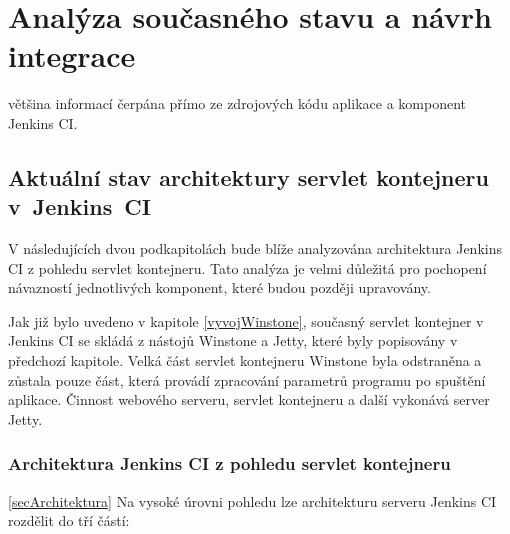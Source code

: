 
\chapter{Analýza současného stavu a návrh integrace}
    většina informací čerpána přímo ze zdrojových kódu aplikace a komponent Jenkins CI.
    
    \section{Aktuální stav architektury servlet kontejneru v~Jenkins~CI}
        V následujících dvou podkapitolách bude blíže analyzována architektura
        Jenkins CI z pohledu servlet kontejneru. Tato analýza je velmi důležitá
        pro pochopení návazností jednotlivých komponent, které budou později upravovány.

        Jak již bylo uvedeno v kapitole \ref{vyvojWinstone}, současný servlet kontejner 
        v Jenkins CI se skládá z nástojů Winstone a Jetty, které byly popisovány v 
        předchozí kapitole. Velká část servlet
        kontejneru Winstone byla odstraněna a zůstala pouze část, která
        provádí zpracování parametrů
        programu po spuštění aplikace. Činnost webového serveru, servlet kontejneru
        a další vykonává server Jetty.
        

        \subsection{Architektura Jenkins CI z pohledu servlet kontejneru} \ref{secArchitektura}
            Na vysoké úrovni pohledu lze architekturu serveru Jenkins CI rozdělit do tří částí:
            
